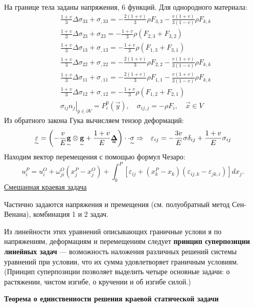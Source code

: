 На границе тела заданы напряжения, 6 функций. Для однородного материала:
$$
\begin{aligned}
& \frac{1+v}{3} \Delta \sigma_{33}+\sigma_{, 33}=-\frac{2(1+v)}{3} \rho F_{3,3}-\frac{v(1+v)}{3(1-v)} \rho F_{k, k} \\
& \frac{1+v}{3} \Delta \sigma_{23}+\sigma_{23}=-\frac{1+v}{3} \rho\left(F_{2,3}+F_{3,2}\right) \\
& \frac{1+v}{3} \Delta \sigma_{13}+\sigma_{, 13}=-\frac{1+v}{3} \rho\left(F_{1,3}+F_{3,1}\right) \\
& \frac{1+v}{3} \Delta \sigma_{22}+\sigma_{, 22}=-\frac{2(1+v)}{3} \rho F_{2,2}-\frac{v(1+v)}{3(1-v)} \rho F_{k, k} \\
& \frac{1+v}{3} \Delta \sigma_{11}+\sigma_{, 11}=-\frac{2(1+v)}{3} \rho F_{1,1}-\frac{v(1+v)}{3(1-v)} \rho F_{k, k} \\
& \frac{1+v}{3} \Delta \sigma_{12}+\sigma_{, 12}=-\frac{1+v}{3} \rho\left(F_{1,2}+F_{2,1}\right) \\
& \left.\sigma_{i j} n_j\right|_{\bar{y} \in \partial V}=P_i^0(\vec{y}), \quad \sigma_{i j, j}=-\rho F_i, \quad \vec{x} \in V 
\end{aligned}
$$
Из обратного закона Гука вычисляем тензор деформаций:
$$
\begin{aligned}
& \underset{\sim}{\varepsilon}=\left(-\frac{v}{E} \underset{\sim}{\mathbf{g}} \otimes \underset{\sim}{\mathbf{g}}+\frac{1+v}{E} \tenq{\Delta}\right) \cdot\cdot \underset{\sim}{\sigma}  \Rightarrow
& \varepsilon_{i j}=-\frac{3 v}{E} \sigma \delta_{i j}+\frac{1+v}{E} \sigma_{i j} 
\end{aligned}
$$
Находим вектор перемещения с помощью формул Чезаро:
$$
u_i^P=u_i^O+\omega_{j i}^O\left(x_j^P-x_j^O\right)+\int_0^P\left[\varepsilon_{i j}+\left(x_k^P-x_k\right)\left(\varepsilon_{i j, k}-\varepsilon_{j k, i}\right)\right] d x_j.
$$
\underline{Смешанная краевая задача}

Частично задаются напряжения и премещения (см. полуобратный метод Сен-Венана), комбинация 1 и 2 задач.


Из линейности этих уравнений описывающих граничные услови я по напряжениям, деформациям и перемещениям следует \textbf{принцип суперпозиции линейных задач} --- возможность наложения  различных решений системы уравнений при условии, что их сумма удовлетворяет граничным условиям. 
(Принцип суперпозиции позволяет выделить четыре основные задачи: о растяжении, чистом изгибе, о кручении и об изгибе силой.)


\textbf{Теорема о единственности решения краевой статической задачи}


